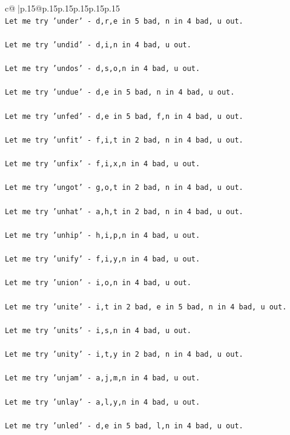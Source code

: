 \documentclass{article}
\begin{document}
{\begin{supertabular}{c@{$\;$}|p{.15\linewidth}@{}p{.15\linewidth}p{.15\linewidth}p{.15\linewidth}p{.15\linewidth}p{.15\linewidth}}
{{{\\ 
\texttt{Let me try 'under' {-} d,r,e in 5 bad, n in 4 bad, u out. } \\
\\ 
\texttt{Let me try 'undid' {-} d,i,n in 4 bad, u out. } \\
\\ 
\texttt{Let me try 'undos' {-} d,s,o,n in 4 bad, u out. } \\
\\ 
\texttt{Let me try 'undue' {-} d,e in 5 bad, n in 4 bad, u out. } \\
\\ 
\texttt{Let me try 'unfed' {-} d,e in 5 bad, f,n in 4 bad, u out. } \\
\\ 
\texttt{Let me try 'unfit' {-} f,i,t in 2 bad, n in 4 bad, u out. } \\
\\ 
\texttt{Let me try 'unfix' {-} f,i,x,n in 4 bad, u out. } \\
\\ 
\texttt{Let me try 'ungot' {-} g,o,t in 2 bad, n in 4 bad, u out. } \\
\\ 
\texttt{Let me try 'unhat' {-} a,h,t in 2 bad, n in 4 bad, u out. } \\
\\ 
\texttt{Let me try 'unhip' {-} h,i,p,n in 4 bad, u out. } \\
\\ 
\texttt{Let me try 'unify' {-} f,i,y,n in 4 bad, u out. } \\
\\ 
\texttt{Let me try 'union' {-} i,o,n in 4 bad, u out. } \\
\\ 
\texttt{Let me try 'unite' {-} i,t in 2 bad, e in 5 bad, n in 4 bad, u out. } \\
\\ 
\texttt{Let me try 'units' {-} i,s,n in 4 bad, u out. } \\
\\ 
\texttt{Let me try 'unity' {-} i,t,y in 2 bad, n in 4 bad, u out. } \\
\\ 
\texttt{Let me try 'unjam' {-} a,j,m,n in 4 bad, u out. } \\
\\ 
\texttt{Let me try 'unlay' {-} a,l,y,n in 4 bad, u out. } \\
\\ 
\texttt{Let me try 'unled' {-} d,e in 5 bad, l,n in 4 bad, u out. } \\
}}}
\end{supertabular}}
\end{document}
